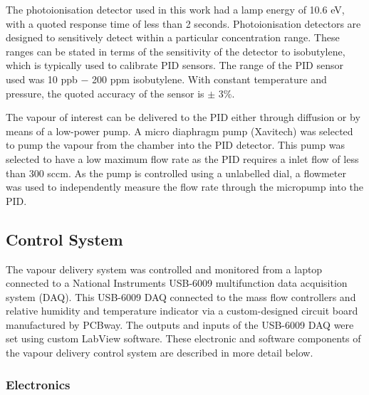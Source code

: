 \documentclass[
  a4paper,
]{scrbook}
\begin{document}
The photoionisation detector used in this work had a lamp energy of 10.6
eV, with a quoted response time of less than 2 seconds. Photoionisation
detectors are designed to sensitively detect within a particular
concentration range. These ranges can be stated in terms of the
sensitivity of the detector to isobutylene, which is typically used to
calibrate PID sensors. The range of the PID sensor used was 10 ppb \(-\)
200 ppm isobutylene. With constant temperature and pressure, the quoted
accuracy of the sensor is \(\pm\) 3\%.

The vapour of interest can be delivered to the PID either through
diffusion or by means of a low-power pump. A micro diaphragm pump
(Xavitech) was selected to pump the vapour from the chamber into the PID
detector. This pump was selected to have a low maximum flow rate as the
PID requires a inlet flow of less than 300 sccm. As the pump is
controlled using a unlabelled dial, a flowmeter was used to
independently measure the flow rate through the micropump into the PID.

\hypertarget{sec-control-system}{%
\subsection{Control System}\label{sec-control-system}}

The vapour delivery system was controlled and monitored from a laptop
connected to a National Instruments USB-6009 multifunction data
acquisition system (DAQ). This USB-6009 DAQ connected to the mass flow
controllers and relative humidity and temperature indicator via a
custom-designed circuit board manufactured by PCBway. The outputs and
inputs of the USB-6009 DAQ were set using custom LabView software. These
electronic and software components of the vapour delivery control system
are described in more detail below.

\hypertarget{electronics}{%
\subsubsection*{Electronics}\label{electronics}}
\end{document}
